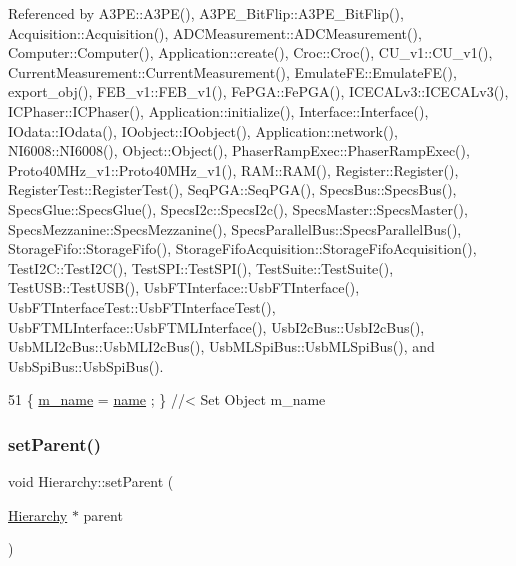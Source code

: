 Referenced by A3\+P\+E\+::\+A3\+P\+E(), A3\+P\+E\+\_\+\+Bit\+Flip\+::\+A3\+P\+E\+\_\+\+Bit\+Flip(), Acquisition\+::\+Acquisition(), A\+D\+C\+Measurement\+::\+A\+D\+C\+Measurement(), Computer\+::\+Computer(), Application\+::create(), Croc\+::\+Croc(), C\+U\+\_\+v1\+::\+C\+U\+\_\+v1(), Current\+Measurement\+::\+Current\+Measurement(), Emulate\+F\+E\+::\+Emulate\+F\+E(), export\+\_\+obj(), F\+E\+B\+\_\+v1\+::\+F\+E\+B\+\_\+v1(), Fe\+P\+G\+A\+::\+Fe\+P\+G\+A(), I\+C\+E\+C\+A\+Lv3\+::\+I\+C\+E\+C\+A\+Lv3(), I\+C\+Phaser\+::\+I\+C\+Phaser(), Application\+::initialize(), Interface\+::\+Interface(), I\+Odata\+::\+I\+Odata(), I\+Oobject\+::\+I\+Oobject(), Application\+::network(), N\+I6008\+::\+N\+I6008(), Object\+::\+Object(), Phaser\+Ramp\+Exec\+::\+Phaser\+Ramp\+Exec(), Proto40\+M\+Hz\+\_\+v1\+::\+Proto40\+M\+Hz\+\_\+v1(), R\+A\+M\+::\+R\+A\+M(), Register\+::\+Register(), Register\+Test\+::\+Register\+Test(), Seq\+P\+G\+A\+::\+Seq\+P\+G\+A(), Specs\+Bus\+::\+Specs\+Bus(), Specs\+Glue\+::\+Specs\+Glue(), Specs\+I2c\+::\+Specs\+I2c(), Specs\+Master\+::\+Specs\+Master(), Specs\+Mezzanine\+::\+Specs\+Mezzanine(), Specs\+Parallel\+Bus\+::\+Specs\+Parallel\+Bus(), Storage\+Fifo\+::\+Storage\+Fifo(), Storage\+Fifo\+Acquisition\+::\+Storage\+Fifo\+Acquisition(), Test\+I2\+C\+::\+Test\+I2\+C(), Test\+S\+P\+I\+::\+Test\+S\+P\+I(), Test\+Suite\+::\+Test\+Suite(), Test\+U\+S\+B\+::\+Test\+U\+S\+B(), Usb\+F\+T\+Interface\+::\+Usb\+F\+T\+Interface(), Usb\+F\+T\+Interface\+Test\+::\+Usb\+F\+T\+Interface\+Test(), Usb\+F\+T\+M\+L\+Interface\+::\+Usb\+F\+T\+M\+L\+Interface(), Usb\+I2c\+Bus\+::\+Usb\+I2c\+Bus(), Usb\+M\+L\+I2c\+Bus\+::\+Usb\+M\+L\+I2c\+Bus(), Usb\+M\+L\+Spi\+Bus\+::\+Usb\+M\+L\+Spi\+Bus(), and Usb\+Spi\+Bus\+::\+Usb\+Spi\+Bus().


\begin{DoxyCode}
51 \{ \hyperlink{classObject_a8b83c95c705d2c3ba0d081fe1710f48d}{m\_name}  = \hyperlink{classObject_a300f4c05dd468c7bb8b3c968868443c1}{name}  ; \} \textcolor{comment}{//< Set Object m\_name}
\end{DoxyCode}
\mbox{\label{classHierarchy_a585ad1aeec16077a0e532ab8b4fc557b}} 
\subsubsection{\texorpdfstring{set\+Parent()}{setParent()}}
{\footnotesize\ttfamily void Hierarchy\+::set\+Parent (\begin{DoxyParamCaption}\item[{\hyperlink{classHierarchy}{Hierarchy} $\ast$}]{parent }\end{DoxyParamCaption})\hspace{0.3cm}{\ttfamily [inherited]}}




